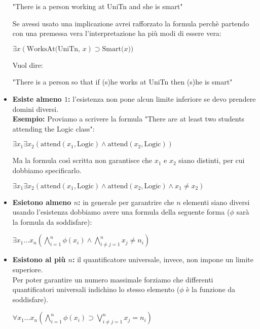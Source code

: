 \documentclass[../main.tex]{subfiles}
\begin{document}
\begin{itemize}
\begin{center}
            "There is a person working at UniTn and she is smart"
         \end{center}
         Se avessi usato una implicazione avrei rafforzato la formula perchè partendo con una premessa vera l'interpretazione ha più modi di essere vera:
         \begin{center}
            $\exists x(\text{WorksAt(UniTn, }x) \supset \text{Smart(}x))$
         \end{center}
         Vuol dire:
         \begin{center}
            "There is a person so that if (s)he works at UniTn then (s)he is smart"
         \end{center}
      \item \textbf{Esiste almeno $1$:} l'esistenza non pone alcun limite inferiore se devo prendere domini diversi.\\
         \textbf{Esempio:} Proviamo a scrivere la formula "There are at least two students attending the Logic class":
         \begin{center}
            $\exists x_1 \exists x_2( \text{attend}(x_1,\text{Logic}) \land \text{attend}(x_2,\text{Logic}))$
         \end{center}
         Ma la formula così scritta non garantisce che $x_1$ e $x_2$ siano distinti, per cui dobbiamo specificarlo.
         \begin{center}
            $\exists x_1 \exists x_2( \text{attend}(x_1,\text{Logic}) \land \text{attend}(x_2,\text{Logic}) \land x_1 \neq x_2)$
         \end{center}  
      \item \textbf{Esietono almeno $n$:} in generale per garantrire che $n$ elementi siano diversi usando l'esistenza dobbiamo avere una formula della seguente forma ($\phi$ sarà la formula da soddisfare):
         \begin{center}
            $\exists x_1 \dots x_n (\bigwedge^{n}_{i=1} \phi (x_i) \land \bigwedge^{n}_{i \neq j=1} x_j \neq n_i)$
         \end{center}
      \item \textbf{Esistono al più $n$:} il quantificatore universale, invece, non impone un limite superiore.\\
         Per poter garantire un numero massimale forziamo che differenti quantificatori universali indichino lo stesso elemento ($\phi$ è la funzione da soddisfare).
         \begin{center}
            $\forall x_1 \dots x_n (\bigwedge^{n}_{i=1} \phi (x_i) \supset \bigvee^{n}_{i \neq j=1} x_j = n_i)$
         \end{center}
   \end{itemize}
\end{document}

